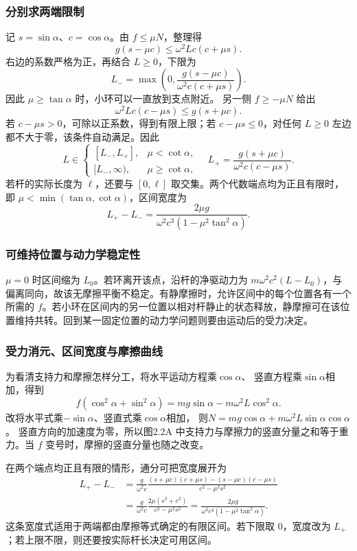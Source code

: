 \documentclass[UTF8,fontset=fandol,a4paper,11pt]{ctexart}
\begin{document}
\subsubsection*{分别求两端限制}
记 $s=\sin\alpha$、$c=\cos\alpha$。由 $f\leq\mu N$，整理得
\[
g(s-\mu c)\leq\omega^2Lc(c+\mu s).
\]
右边的系数严格为正，再结合 $L\geq0$，下限为
\[
\boxed{L_-=\max\left(0,\frac{g(s-\mu c)}{\omega^2c(c+\mu s)}\right)}.
\]
因此 $\mu\geq\tan\alpha$ 时，小环可以一直放到支点附近。
另一侧 $f\geq-\mu N$ 给出
\[
\omega^2Lc(c-\mu s)\leq g(s+\mu c).
\]
若 $c-\mu s>0$，可除以正系数，得到有限上限；若 $c-\mu s\leq0$，对任何 $L\geq0$ 左边都不大于零，该条件自动满足。因此
\[
\boxed{L\in\begin{cases}
[L_-,L_+],&\mu<\cot\alpha,\\
[L_-,\infty),&\mu\geq\cot\alpha,
\end{cases}\quad
L_+=\frac{g(s+\mu c)}{\omega^2c(c-\mu s)}}.
\]
若杆的实际长度为 $\ell$，还要与 $[0,\ell]$ 取交集。两个代数端点均为正且有限时，即 $\mu<\min(\tan\alpha,\cot\alpha)$，区间宽度为
\[
L_+-L_-=\frac{2\mu g}{\omega^2c^3(1-\mu^2\tan^2\alpha)}.
\]
\subsubsection*{可维持位置与动力学稳定性}
$\mu=0$ 时区间缩为 $L_0$。若环离开该点，沿杆的净驱动力为 $m\omega^2c^2(L-L_0)$，与偏离同向，故该无摩擦平衡不稳定。有静摩擦时，允许区间中的每个位置各有一个所需的 $f$。若小环在区间内的另一位置以相对杆静止的状态释放，静摩擦可在该位置维持共转。回到某一固定位置的动力学问题则要由运动后的受力决定。
\subsubsection*{受力消元、区间宽度与摩擦曲线}
为看清支持力和摩擦怎样分工，将水平运动方程乘$\cos\alpha$、
竖直方程乘$\sin\alpha$相加，得到
\[
f(\cos^2\alpha+\sin^2\alpha)
=mg\sin\alpha-m\omega^2L\cos^2\alpha.
\]
改将水平式乘$-\sin\alpha$、竖直式乘$\cos\alpha$相加，
则$N=mg\cos\alpha+m\omega^2L\sin\alpha\cos\alpha$。
竖直方向的加速度为零，所以图2.2A 中支持力与摩擦力的竖直分量之和等于重力。当 $f$ 变号时，摩擦的竖直分量也随之改变。

在两个端点均正且有限的情形，通分可把宽度展开为
\[
\begin{aligned}
L_+-L_-&=\frac g{\omega^2c}
\frac{(s+\mu c)(c+\mu s)-(s-\mu c)(c-\mu s)}
{c^2-\mu^2s^2}\\
&=\frac g{\omega^2c}
\frac{2\mu(s^2+c^2)}{c^2-\mu^2s^2}
=\frac{2\mu g}{\omega^2c^3(1-\mu^2\tan^2\alpha)}.
\end{aligned}
\]
这条宽度式适用于两端都由摩擦等式确定的有限区间。若下限取 $0$，宽度改为 $L_+$；若上限不限，则还要按实际杆长决定可用区间。
\end{document}
